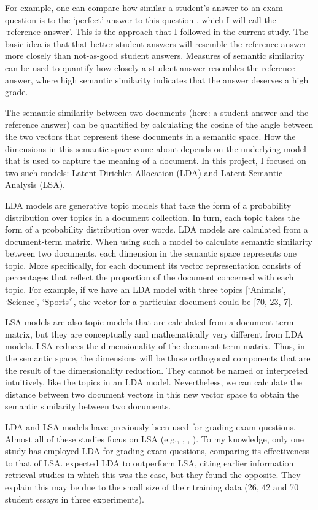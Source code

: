 \documentclass[a4paper,10pt,twoside]{article}
\begin{document}
For example, one can compare how similar a student's answer to an exam question is to the `perfect' answer to this question \cite{wolfe1998}, which I will call the `reference answer'. This is the approach that I followed in the current study. The basic idea is that that better student answers will resemble the reference answer more closely than not-as-good student answers. Measures of semantic similarity can be used to quantify how closely a student answer resembles the reference answer, where high semantic similarity indicates that the answer deserves a high grade.

The semantic similarity between two documents (here: a student answer and the reference answer) can be quantified by calculating the cosine of the angle between the two vectors that represent these documents in a semantic space. How the dimensions in this semantic space come about depends on the underlying model that is used to capture the meaning of a document. In this project, I focused on two such models: Latent Dirichlet Allocation (LDA) and Latent Semantic Analysis (LSA).

LDA models \cite{blei2003} are generative topic models that take the form of a probability distribution over topics in a document collection. In turn, each topic takes the form of a probability distribution over words. LDA models are calculated from a document-term matrix. When using such a model to calculate semantic similarity between two documents, each dimension in the semantic space represents one topic. More specifically, for each document its vector representation consists of percentages that reflect the proportion of the document concerned with each topic. For example, if we have an LDA model with three topics [`Animals', `Science', `Sports'], the vector for a particular document could be [70, 23, 7].

LSA models \cite{landauer1997} are also topic models that are calculated from a document-term matrix, but they are conceptually and mathematically very different from LDA models. LSA reduces the dimensionality of the document-term matrix. Thus, in the semantic space, the dimensions will be those orthogonal components that are the result of the dimensionality reduction. They cannot be named or interpreted intuitively, like the topics in an LDA model. Nevertheless, we can calculate the distance between two document vectors in this new vector space to obtain the semantic similarity between two documents.

LDA and LSA models have previously been used for grading exam questions. Almost all of these studies focus on LSA (e.g., , , ). To my knowledge, only one study \cite{kakkonen2008} has employed LDA for grading exam questions, comparing its effectiveness to that of LSA.  expected LDA to outperform LSA, citing earlier information retrieval studies in which this was the case, but they found the opposite. They explain this may be due to the small size of their training data (26, 42 and 70 student essays in three experiments).
\end{document}
